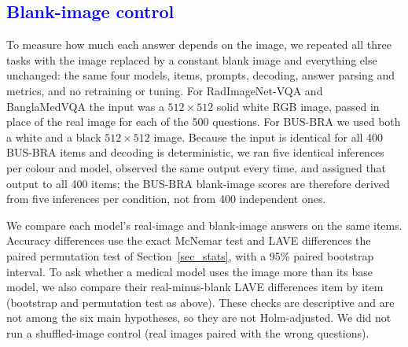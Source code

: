 

\subsection{\textcolor{blue}{Blank-image control}}
\label{sec_blank_method}
{\color{blue}
To measure how much each answer depends on the image, we repeated all three tasks with the image replaced by a constant blank image and everything else unchanged: the same four models, items, prompts, decoding, answer parsing and metrics, and no retraining or tuning. For RadImageNet-VQA and BanglaMedVQA the input was a $512\times512$ solid white RGB image, passed in place of the real image for each of the 500 questions. For BUS-BRA we used both a white and a black $512\times512$ image. Because the input is identical for all 400 BUS-BRA items and decoding is deterministic, we ran five identical inferences per colour and model, observed the same output every time, and assigned that output to all 400 items; the BUS-BRA blank-image scores are therefore derived from five inferences per condition, not from 400 independent ones.

We compare each model's real-image and blank-image answers on the same items. Accuracy differences use the exact McNemar test and LAVE differences the paired permutation test of Section~\ref{sec_stats}, with a 95\% paired bootstrap interval. To ask whether a medical model uses the image more than its base model, we also compare their real-minus-blank LAVE differences item by item (bootstrap and permutation test as above). These checks are descriptive and are not among the six main hypotheses, so they are not Holm-adjusted. We did not run a shuffled-image control (real images paired with the wrong questions).
}


